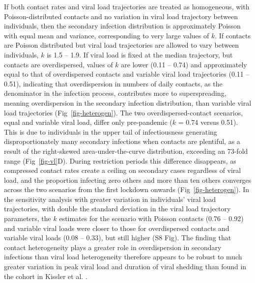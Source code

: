 \documentclass[
  10pt,
  letterpaper,
]{article}
\begin{document}
If both contact rates and viral load trajectories are treated as
homogeneous, with Poisson-distributed contacts and no variation in viral
load trajectory between individuals, then the secondary infection
distribution is approximately Poisson with equal mean and variance,
corresponding to very large values of \(k\). If contacts are Poisson
distributed but viral load trajectories are allowed to vary between
individuals, \(k\) is 1.5 -- 1.9. If viral load is fixed at the median
trajectory, but contacts are overdispersed, values of \(k\) are lower
(0.11 -- 0.74) and approximately equal to that of overdispersed contacts
and variable viral load trajectories (0.11 -- 0.51), indicating that
overdispersion in numbers of daily contacts, as the denominator in the
infection process, contributes more to superspreading, meaning
overdispersion in the secondary infection distribution, than variable
viral load trajectories (Fig~\ref{fig-heterogen}). The two
overdispersed-contact scenarios, equal and variable viral load, differ
only pre-pandemic (\(k\) = 0.74 versus 0.51). This is due to individuals
in the upper tail of infectiousness generating disproportionately many
secondary infections when contacts are plentiful, as a result of the
right-skewed area-under-the-curve distribution, exceeding an 73-fold
range (Fig~\ref{fig-vl}D). During restriction periods this difference
disappears, as compressed contact rates create a ceiling on secondary
cases regardless of viral load, and the proportion infecting zero others
and more than ten others converges across the two scenarios from the
first lockdown onwards (Fig~\ref{fig-heterogen}). In the sensitivity
analysis with greater variation in individuals' viral load trajectories,
with double the standard deviation in the viral load trajectory
parameters, the \(k\) estimates for the scenario with Poisson contacts
(0.76 -- 0.92) and variable viral loads were closer to those for
overdispersed contacts and variable viral loads (0.08 -- 0.33), but
still higher (S8 Fig). The finding that contact heterogeneity plays a
greater role in overdispersion in secondary infections than viral load
heterogeneity therefore appears to be robust to much greater variation
in peak viral load and duration of viral shedding than found in the
cohort in Kissler et al. \citep{kissler2021}.
\end{document}
